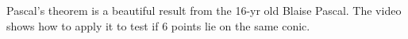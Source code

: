 Pascal's theorem is a beautiful result from the 16-yr old Blaise Pascal. The video shows how to apply it to test if 6 points lie on the same conic.